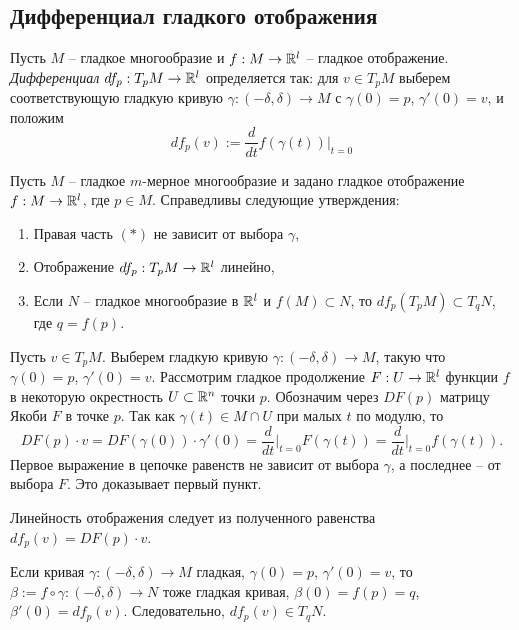 
\subsection{Дифференциал гладкого отображения}


\begin{definition}
	Пусть $M$ -- гладкое многообразие и $f : M \to \mathbb{R}^l$ -- гладкое отображение. \textit{Дифференциал} $df_p : T_p M \to \mathbb{R}^l$ 
	определяется так: для $v \in T_p M$ выберем соответствующую гладкую кривую $\gamma : (-\delta, \delta) \to M$ с $\gamma(0) = p$, $\gamma'(0) = v$, и положим 
	\[ df_p (v) := \frac{d}{dt} f(\gamma(t)) \Big|_{t=0} \tag{$*$} \]
\end{definition}

\begin{theorem}
	Пусть $M$ -- гладкое $m$-мерное многообразие и задано гладкое отображение $f : M \to \mathbb{R}^l$, где $p \in M$. 
	Справедливы следующие утверждения:
	\begin{enumerate}[itemsep = 0pt, topsep = 5pt]
		\item Правая часть $(*)$ не зависит от выбора $\gamma$,
		\item Отображение $df_p : T_p M \to \mathbb{R}^l$ линейно,
		\item Если $N$ -- гладкое многообразие в $\mathbb{R}^l$ и $f(M) \subset N$, то $df_p(T_p M) \subset T_q N$, где $q = f(p)$.
	\end{enumerate}
\end{theorem}

\begin{myproof}
	Пусть $v \in T_p M$. Выберем гладкую кривую $\gamma : (-\delta, \delta) \to M$, 
	такую что $\gamma(0) = p$, $\gamma'(0) = v$. 
	Рассмотрим гладкое продолжение $F : U \to \mathbb{R}^l$ функции $f$ в некоторую окрестность $U \subset \mathbb{R}^n$ точки $p$.
	Обозначим через $DF(p)$ матрицу Якоби $F$ в точке $p$. Так как $\gamma(t) \in M \cap U$ при малых $t$ по модулю, то 
	\[ DF(p) \cdot v = DF(\gamma(0)) \cdot \gamma'(0) = \frac{d}{dt} \Big|_{t=0} F(\gamma(t)) = \frac{d}{dt} \Big|_{t=0} f(\gamma(t)). \]
	Первое выражение в цепочке равенств не зависит от выбора $\gamma$, а последнее -- от выбора $F$. Это доказывает первый пункт.

	\vspace{5pt}
	Линейность отображения следует из полученного равенства $df_p(v) = DF(p) \cdot v$.

	\vspace{5pt}
	Если кривая $\gamma : (-\delta, \delta) \to M$ гладкая, $\gamma(0) = p$, $\gamma'(0) = v$, то 
	$\beta := f \circ \gamma : (-\delta, \delta) \to N$ тоже гладкая кривая, $\beta(0) = f(p) = q$, $\beta'(0) = df_p (v)$.
	Следовательно, $df_p (v) \in T_q N$.
\end{myproof}


